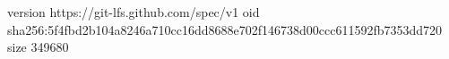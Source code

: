 version https://git-lfs.github.com/spec/v1
oid sha256:5f4fbd2b104a8246a710cc16dd8688e702f146738d00ccc611592fb7353dd720
size 349680
